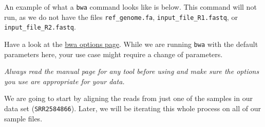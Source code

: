 \documentclass[
  letterpaper,
  DIV=11,
  numbers=noendperiod]{scrreprt}
\newenvironment{Shaded}{\begin{snugshade}}{\end{snugshade}}
\newcommand{\DataTypeTok}[1]{\textcolor[rgb]{0.68,0.00,0.00}{#1}}
\newcommand{\ExtensionTok}[1]{\textcolor[rgb]{0.00,0.23,0.31}{#1}}
\newcommand{\NormalTok}[1]{\textcolor[rgb]{0.00,0.23,0.31}{#1}}
\newcommand{\OperatorTok}[1]{\textcolor[rgb]{0.37,0.37,0.37}{#1}}
\begin{document}
An example of what a \texttt{bwa} command looks like is below. This
command will not run, as we do not have the files
\texttt{ref\_genome.fa}, \texttt{input\_file\_R1.fastq}, or
\texttt{input\_file\_R2.fastq}.

\begin{Shaded}
\end{Shaded}

Have a look at the \href{http://bio-bwa.sourceforge.net/bwa.shtml}{bwa
options page}. While we are running \texttt{bwa} with the default
parameters here, your use case might require a change of parameters.

\begin{tcolorbox}[enhanced jigsaw, toptitle=1mm, breakable, bottomrule=.15mm, colback=white, toprule=.15mm, opacityback=0, bottomtitle=1mm, coltitle=black, opacitybacktitle=0.6, rightrule=.15mm, colframe=quarto-callout-tip-color-frame, titlerule=0mm, colbacktitle=quarto-callout-tip-color!10!white, title=\textcolor{quarto-callout-tip-color}{\faLightbulb}\hspace{0.5em}{Tip}, left=2mm, leftrule=.75mm, arc=.35mm]

\emph{Always read the manual page for any tool before using and make
sure the options you use are appropriate for your data.}

\end{tcolorbox}

We are going to start by aligning the reads from just one of the samples
in our data set (\texttt{SRR2584866}). Later, we will be iterating this
whole process on all of our sample files.

\begin{Shaded}
\end{Shaded}
\end{document}
